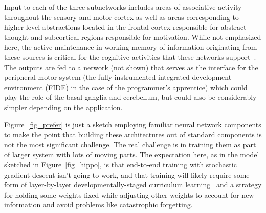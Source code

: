 \documentclass[letterpaper,11pt]{article}
\def\footnote#1{{}}
\def\urlh#1{{}}
\begin{document}
Input to each of the three subnetworks includes areas of associative activity throughout the sensory and motor cortex as well as areas corresponding to higher-level abstractions located in the frontal cortex responsible for abstract thought and subcortical regions responsible for motivation. While not emphasized here, the active maintenance in working memory of information originating from these sources\footnote{%
  Susan Courtney provides an excellent overview of the many sources of information that are utilized by cognitive functions supported in the frontal cortex~\cite{CourtneyCABN-04}. In particular, her articulation of the role of attention and cognitive control aligns with the views that we've emphasized in class and that drive our designs:
\begin{quotation}
  [The circuits in the prefrontal cortex that drive goal directed planning and executive control] receive multimodal information about the current environment and have access to previously stored memories. The prefrontal cortex's extensive outputs allow for direct control of motor behavior, but they may also influence behavior indirectly by altering perceptual and cognitive representations and influencing the storage and re- trieval of long-term memories.\\
  I suggest that attention and cognitive control are not directed actions or specific processes contained within any particular set of brain regions. Rather, what we experience and observe that we call attention and cognitive control are emergent properties dependent on the dis- tributed representation of all types of information, both that available from present perceptual input and the information currently sustained in WM, including contextual and motivational information.
%
\end{quotation}}
%
is critical for the cognitive activities that these networks support~\cite{CourtneyCABN-04,Goldman-RakicARN-88}. The outputs are fed to a network (not shown) that serves as the interface for the peripheral motor system (the fully instrumented integrated development environment (FIDE) in the case of the programmer's apprentice) which could play the role of the basal ganglia and cerebellum, but could also be considerably simpler depending on the application.

Figure~{\urlh{#fig_Prefrontal_Hierarchy_Biology_Technology}{\ref{fig_prefer}}} is just a sketch employing familiar neural network components to make the point that building these architectures out of standard components is not the most significant challenge. The real challenge is in training them as part of larger system with lots of moving parts. The expectation here, as in the model sketched in Figure~{\urlh{#fig_Hippocampus_Inspired_Learning_Redux}{\ref{fig_hippo}}}, is that end-to-end training with stochastic gradient descent isn't going to work, and that training will likely require some form of layer-by-layer developmentally-staged curriculum learning~\cite{LampinenetalCoRR-19,GulcehreetalCoRR-16,BengioetalCoRR-15,BengioetalICML-09} and a strategy for holding some weights fixed while adjusting other weights to account for new information and avoid problems like catastrophic forgetting.
\end{document}
